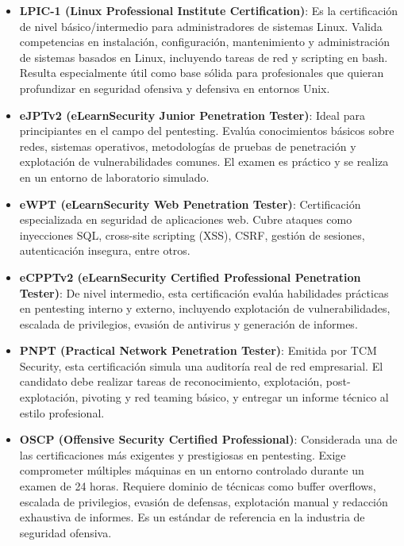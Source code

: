 \documentclass[a4paper, 10pt]{article}
\begin{document}
\begin{itemize}
    \item \textbf{LPIC-1 (Linux Professional Institute Certification)}: Es la certificación de nivel básico/intermedio para administradores de sistemas Linux. Valida competencias en instalación, configuración, mantenimiento y administración de sistemas basados en Linux, incluyendo tareas de red y scripting en bash. Resulta especialmente útil como base sólida para profesionales que quieran profundizar en seguridad ofensiva y defensiva en entornos Unix.

    \item \textbf{eJPTv2 (eLearnSecurity Junior Penetration Tester)}: Ideal para principiantes en el campo del pentesting. Evalúa conocimientos básicos sobre redes, sistemas operativos, metodologías de pruebas de penetración y explotación de vulnerabilidades comunes. El examen es práctico y se realiza en un entorno de laboratorio simulado.

    \item \textbf{eWPT (eLearnSecurity Web Penetration Tester)}: Certificación especializada en seguridad de aplicaciones web. Cubre ataques como inyecciones SQL, cross-site scripting (XSS), CSRF, gestión de sesiones, autenticación insegura, entre otros.

    \item \textbf{eCPPTv2 (eLearnSecurity Certified Professional Penetration Tester)}: De nivel intermedio, esta certificación evalúa habilidades prácticas en pentesting interno y externo, incluyendo explotación de vulnerabilidades, escalada de privilegios, evasión de antivirus y generación de informes.

    \item \textbf{PNPT (Practical Network Penetration Tester)}: Emitida por TCM Security, esta certificación simula una auditoría real de red empresarial. El candidato debe realizar tareas de reconocimiento, explotación, post-explotación, pivoting y red teaming básico, y entregar un informe técnico al estilo profesional.

    \item \textbf{OSCP (Offensive Security Certified Professional)}: Considerada una de las certificaciones más exigentes y prestigiosas en pentesting. Exige comprometer múltiples máquinas en un entorno controlado durante un examen de 24 horas. Requiere dominio de técnicas como buffer overflows, escalada de privilegios, evasión de defensas, explotación manual y redacción exhaustiva de informes. Es un estándar de referencia en la industria de seguridad ofensiva.
\end{itemize}
\end{document}
